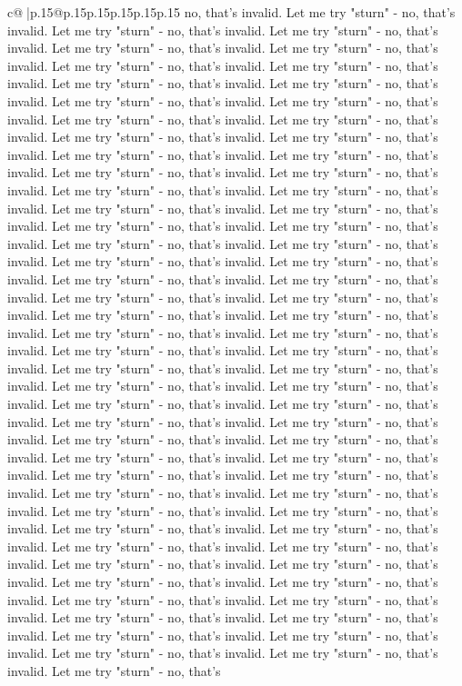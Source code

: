 \documentclass{article}
\begin{document}
{\begin{supertabular}{c@{$\;$}|p{.15\linewidth}@{}p{.15\linewidth}p{.15\linewidth}p{.15\linewidth}p{.15\linewidth}p{.15\linewidth}}
{{{no, that's invalid. Let me try "sturn" {-} no, that's invalid. Let me try "sturn" {-} no, that's invalid. Let me try "sturn" {-} no, that's invalid. Let me try "sturn" {-} no, that's invalid. Let me try "sturn" {-} no, that's invalid. Let me try "sturn" {-} no, that's invalid. Let me try "sturn" {-} no, that's invalid. Let me try "sturn" {-} no, that's invalid. Let me try "sturn" {-} no, that's invalid. Let me try "sturn" {-} no, that's invalid. Let me try "sturn" {-} no, that's invalid. Let me try "sturn" {-} no, that's invalid. Let me try "sturn" {-} no, that's invalid. Let me try "sturn" {-} no, that's invalid. Let me try "sturn" {-} no, that's invalid. Let me try "sturn" {-} no, that's invalid. Let me try "sturn" {-} no, that's invalid. Let me try "sturn" {-} no, that's invalid. Let me try "sturn" {-} no, that's invalid. Let me try "sturn" {-} no, that's invalid. Let me try "sturn" {-} no, that's invalid. Let me try "sturn" {-} no, that's invalid. Let me try "sturn" {-} no, that's invalid. Let me try "sturn" {-} no, that's invalid. Let me try "sturn" {-} no, that's invalid. Let me try "sturn" {-} no, that's invalid. Let me try "sturn" {-} no, that's invalid. Let me try "sturn" {-} no, that's invalid. Let me try "sturn" {-} no, that's invalid. Let me try "sturn" {-} no, that's invalid. Let me try "sturn" {-} no, that's invalid. Let me try "sturn" {-} no, that's invalid. Let me try "sturn" {-} no, that's invalid. Let me try "sturn" {-} no, that's invalid. Let me try "sturn" {-} no, that's invalid. Let me try "sturn" {-} no, that's invalid. Let me try "sturn" {-} no, that's invalid. Let me try "sturn" {-} no, that's invalid. Let me try "sturn" {-} no, that's invalid. Let me try "sturn" {-} no, that's invalid. Let me try "sturn" {-} no, that's invalid. Let me try "sturn" {-} no, that's invalid. Let me try "sturn" {-} no, that's invalid. Let me try "sturn" {-} no, that's invalid. Let me try "sturn" {-} no, that's invalid. Let me try "sturn" {-} no, that's invalid. Let me try "sturn" {-} no, that's invalid. Let me try "sturn" {-} no, that's invalid. Let me try "sturn" {-} no, that's invalid. Let me try "sturn" {-} no, that's invalid. Let me try "sturn" {-} no, that's invalid. Let me try "sturn" {-} no, that's invalid. Let me try "sturn" {-} no, that's invalid. Let me try "sturn" {-} no, that's invalid. Let me try "sturn" {-} no, that's invalid. Let me try "sturn" {-} no, that's invalid. Let me try "sturn" {-} no, that's invalid. Let me try "sturn" {-} no, that's invalid. Let me try "sturn" {-} no, that's invalid. Let me try "sturn" {-} no, that's invalid. Let me try "sturn" {-} no, that's invalid. Let me try "sturn" {-} no, that's invalid. Let me try "sturn" {-} no, that's invalid. Let me try "sturn" {-} no, that's invalid. Let me try "sturn" {-} no, that's invalid. Let me try "sturn" {-} no, that's invalid. Let me try "sturn" {-} no, that's invalid. Let me try "sturn" {-} no, that's invalid. Let me try "sturn" {-} no, that's invalid. Let me try "sturn" {-} no, that's invalid. Let me try "sturn" {-} no, that's invalid. Let me try "sturn" {-} no, that's invalid. Let me try "sturn" {-} no, that's invalid. Let me try "sturn" {-} no, that's }}}
\end{supertabular}}
\end{document}
